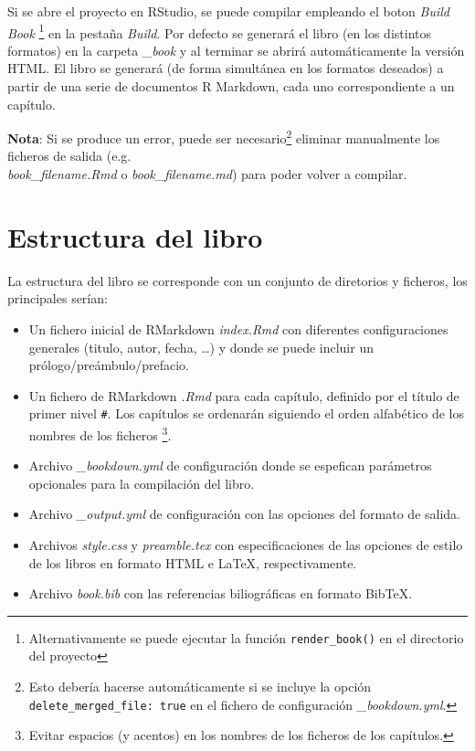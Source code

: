 \documentclass[]{book}
\let\rmarkdownfootnote\footnote%
\def\footnote{\protect\rmarkdownfootnote}
\theoremstyle{definition}
\theoremstyle{definition}
\theoremstyle{definition}
\theoremstyle{remark}
\begin{document}
Si se abre el proyecto en RStudio, se puede compilar empleando el boton
\emph{Build Book} \footnote{Alternativamente se puede ejecutar la
  función \texttt{render\_book()} en el directorio del proyecto} en la
pestaña \emph{Build}. Por defecto se generará el libro (en los distintos
formatos) en la carpeta \emph{\_book} y al terminar se abrirá
automáticamente la versión HTML. El libro se generará (de forma
simultánea en los formatos deseados) a partir de una serie de documentos
R Markdown, cada uno correspondiente a un capítulo.

\textbf{Nota}: Si se produce un error, puede ser necesario\footnote{Esto
  debería hacerse automáticamente si se incluye la opción
  \texttt{delete\_merged\_file:\ true} en el fichero de configuración
  \emph{\_bookdown.yml}.} eliminar manualmente los ficheros de salida
(e.g.\\
\emph{book\_filename.Rmd} o \emph{book\_filename.md}) para poder volver
a compilar.

\section{Estructura del libro}\label{estructura-del-libro}

La estructura del libro se corresponde con un conjunto de diretorios y
ficheros, los principales serían:

\begin{itemize}
\item
  Un fichero inicial de RMarkdown \emph{index.Rmd} con diferentes
  configuraciones generales (titulo, autor, fecha, \ldots{}) y donde se
  puede incluir un prólogo/preámbulo/prefacio.
\item
  Un fichero de RMarkdown \emph{.Rmd} para cada capítulo, definido por
  el título de primer nivel \texttt{\#}. Los capítulos se ordenarán
  siguiendo el orden alfabético de los nombres de los ficheros
  \footnote{Evitar espacios (y acentos) en los nombres de los ficheros
    de los capítulos.}.
\item
  Archivo \emph{\_bookdown.yml} de configuración donde se espefican
  parámetros opcionales para la compilación del libro.
\item
  Archivo \emph{\_output.yml} de configuración con las opciones del
  formato de salida.
\item
  Archivos \emph{style.css} y \emph{preamble.tex} con especificaciones
  de las opciones de estilo de los libros en formato HTML e LaTeX,
  respectivamente.
\item
  Archivo \emph{book.bib} con las referencias biliográficas en formato
  BibTeX.
\end{itemize}
\end{document}
